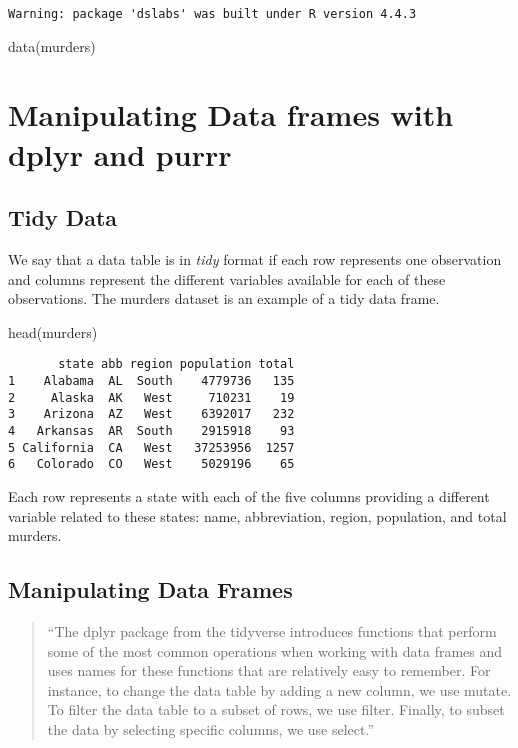 \documentclass[
  letterpaper,
  DIV=11,
  numbers=noendperiod]{scrreprt}
\newenvironment{Shaded}{\begin{snugshade}}{\end{snugshade}}
\newcommand{\FunctionTok}[1]{\textcolor[rgb]{0.28,0.35,0.67}{#1}}
\newcommand{\NormalTok}[1]{\textcolor[rgb]{0.00,0.23,0.31}{#1}}
\begin{document}
\begin{verbatim}
Warning: package 'dslabs' was built under R version 4.4.3
\end{verbatim}

\begin{Shaded}
\begin{Highlighting}[]
\FunctionTok{data}\NormalTok{(murders)}
\end{Highlighting}
\end{Shaded}

\chapter{Manipulating Data frames with dplyr and
purrr}\label{manipulating-data-frames-with-dplyr-and-purrr}

\section{Tidy Data}\label{tidy-data}

We say that a data table is in \emph{tidy} format if each row represents
one observation and columns represent the different variables available
for each of these observations. The murders dataset is an example of a
tidy data frame.

\begin{Shaded}
\begin{Highlighting}[]
\FunctionTok{head}\NormalTok{(murders)}
\end{Highlighting}
\end{Shaded}

\begin{verbatim}
       state abb region population total
1    Alabama  AL  South    4779736   135
2     Alaska  AK   West     710231    19
3    Arizona  AZ   West    6392017   232
4   Arkansas  AR  South    2915918    93
5 California  CA   West   37253956  1257
6   Colorado  CO   West    5029196    65
\end{verbatim}

Each row represents a state with each of the five columns providing a
different variable related to these states: name, abbreviation, region,
population, and total murders.

\section{Manipulating Data Frames}\label{manipulating-data-frames}

\begin{quote}
``The dplyr package from the tidyverse introduces functions that perform
some of the most common operations when working with data frames and
uses names for these functions that are relatively easy to remember. For
instance, to change the data table by adding a new column, we use
mutate. To filter the data table to a subset of rows, we use filter.
Finally, to subset the data by selecting specific columns, we use
select.''
\end{quote}
\end{document}
